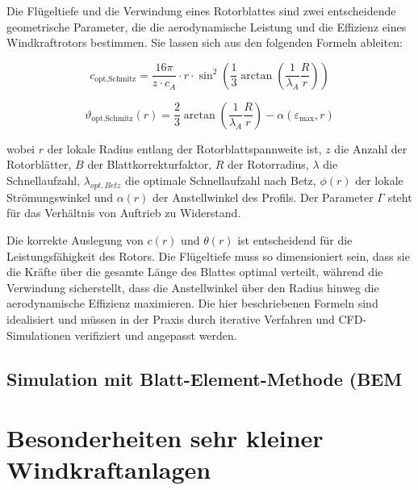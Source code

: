 Die Flügeltiefe  und die Verwindung  eines Rotorblattes sind zwei entscheidende geometrische Parameter, die die aerodynamische Leistung und die Effizienz eines Windkraftrotors bestimmen. Sie lassen sich aus den folgenden Formeln ableiten:

\begin{equation}
c_{\text{opt,Schmitz}} = \frac{16 \pi}{z \cdot c_A} \cdot r \cdot \sin^2 \left( \frac{1}{3} \arctan \left( \frac{1}{\lambda_A }\frac{R}{r} \right) \right)
\end{equation}

\begin{equation}
\vartheta_{\text{opt,Schmitz}}(r) = \frac{2}{3} \arctan \left( \frac{1}{\lambda_A} \frac{R}{r} \right) - \alpha \left( \varepsilon_{\text{max}}, r \right)
\end{equation}



wobei \( r \) der lokale Radius entlang der Rotorblattspannweite ist, \( z \) die Anzahl der Rotorblätter, \( B \) der Blattkorrekturfaktor, \( R \) der Rotorradius, \( \lambda \) die Schnellaufzahl, \( \lambda_{opt,Betz} \) die optimale Schnellaufzahl nach Betz, \( \phi(r) \) der lokale Strömungswinkel und \( \alpha(r) \) der Anstellwinkel des Profils. Der Parameter \( \Gamma \) steht für das Verhältnis von Auftrieb zu Widerstand.

Die korrekte Auslegung von \( c(r) \) und \( \theta(r) \) ist entscheidend für die Leistungsfähigkeit des Rotors. Die Flügeltiefe muss so dimensioniert sein, dass sie die Kräfte über die gesamte Länge des Blattes optimal verteilt, während die Verwindung sicherstellt, dass die Anstellwinkel über den Radius hinweg die aerodynamische Effizienz maximieren. Die hier beschriebenen Formeln sind idealisiert und müssen in der Praxis durch iterative Verfahren und CFD-Simulationen verifiziert und angepasst werden.

\subsection{Simulation mit Blatt-Element-Methode (BEM}
\section{Besonderheiten sehr kleiner Windkraftanlagen}